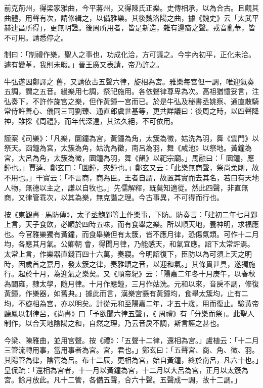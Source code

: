 \begin{pinyinscope}
 前克荊州，得梁家雅曲，今平蔣州，又得陳氏正樂。史傳相承，以為合古。且觀其曲體，用聲有次，請修緝之，以備雅樂。其後魏洛陽之曲，據《魏史》云「太武平赫連昌所得」，更無明證。後周所用者，皆是新造，雜有邊裔之聲。戎音亂華，皆不可用。請悉停之。



 制曰：「制禮作樂，聖人之事也，功成化洽，方可議之。今宇內初平，正化未洽。遽有變革，我則未暇。」晉王廣又表請，帝乃許之。



 牛弘遂因鄭譯之
 舊，又請依古五聲六律，旋相為宮。雅樂每宮但一調，唯迎氣奏五調，謂之五音。縵樂用七調，祭祀施用。各依聲律尊卑為次。高祖猶憶妥言，注弘奏下，不許作旋宮之樂，但作黃鐘一宮而已。於是牛弘及秘書丞姚察、通直散騎常侍許善心、儀同三司劉臻、通直郎虞世基等，更共詳議曰：後周之時，以四聲降神，雖採《周禮》，而年代深遠，其法久絕，不可依用。



 謹案《司樂》：「凡樂，圜鐘為宮，黃鐘為角，太簇為徵，姑洗為羽，舞《雲門》以祭天。函鐘為宮，太簇為角，姑洗為徵，南呂為羽，舞《咸池》以祭地。黃鐘為宮，大呂為角，太簇為徵，圜鐘為羽，舞《韻》以祀宗廟。」馬融曰：「
 圜鐘，應鐘也。」賈逵、鄭玄曰：「圜鐘，夾鐘也。」鄭玄又云：「此樂無商聲，祭尚柔剛，故不用也。」干寶云：「不言商，商為臣。王者自謂，故置其實而去其名，若曰有天地人物，無德以主之，謙以自牧也。」先儒解釋，既莫知適從。然此四聲，非直無商，又律管乖次，以其為樂，無克諧之理。今古事異，不可得而行也。



 按《東觀書·馬防傳》，太子丞鮑鄴等上作樂事，下防。防奏言：「建初二年七月鄴上言，天子食飲，必順於四時五味，而有食舉之樂。所以順天地，養神明，求福應也。今官雅樂獨有黃鐘，而食舉樂但有太簇，皆不應月律，恐傷氣類。可作十二月均，各應其月氣。公卿朝
 會，得聞月律，乃能感天，和氣宜應。詔下太常評焉。太常上言，作樂器直錢百四十六萬，奏寢。今明詔復下，臣防以為可須上天之明時，因歲首之嘉月，發太簇之律，奏雅頌之音，以迎和氣。」其條貫甚具，遂獨施行。起於十月，為迎氣之樂矣。又《順帝紀》云：「陽嘉二年冬十月庚午，以春秋為闢雍，隸太學，隨月律。十月作應鐘，三月作姑洗。元和以來，音戾不調，修復黃鐘，作樂器，如舊典。」據此而言，漢樂宮懸有黃鐘均，食舉太簇均，止有二均，不旋相為宮，亦以明矣。計從元和至陽嘉二年，才五十歲，用而復止。驗黃帝聽鳳以制律呂，《尚書》曰「予欲聞六律五聲」，《
 周禮》有「分樂而祭」。此聖人制作，以合天地陰陽之和，自然之理，乃云音戾不調，斯言誣之甚也。



 今梁、陳雅曲，並用宮聲。按《禮》：「五聲十二律，還相為宮。」盧植云：「十二月三管流轉用事，當用事者為宮。宮，君也。」鄭玄曰：「五聲宮、商、角、徵、羽。其陽管為律，陰管為呂。布十二辰，更相為宮，始自黃鐘，終於南呂，凡六十也。」皇侃疏：「還相為宮者，十一月以黃鐘為宮，十二月以大呂為宮，正月以太簇為宮。餘月放此。凡十二管，各備五聲，合六十聲。五聲成一調，故十二調。」




\end{pinyinscope}
